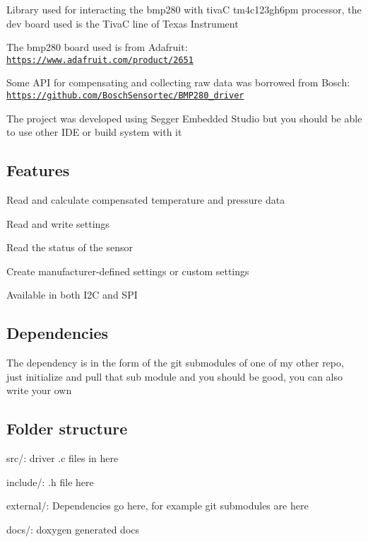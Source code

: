 Library used for interacting the bmp280 with tivaC tm4c123gh6pm processor, the dev board used is the TivaC line of Texas Instrument

The bmp280 board used is from Adafruit\+: \href{https://www.adafruit.com/product/2651}{\tt https\+://www.\+adafruit.\+com/product/2651}

Some A\+PI for compensating and collecting raw data was borrowed from Bosch\+: \href{https://github.com/BoschSensortec/BMP280_driver}{\tt https\+://github.\+com/\+Bosch\+Sensortec/\+B\+M\+P280\+\_\+driver}

The project was developed using Segger Embedded Studio but you should be able to use other I\+DE or build system with it

\subsection*{Features}


\begin{DoxyItemize}
\item Read and calculate compensated temperature and pressure data
\item Read and write settings
\item Read the status of the sensor
\item Create manufacturer-\/defined settings or custom settings
\item Available in both I2C and S\+PI
\end{DoxyItemize}

\subsection*{Dependencies}

The dependency is in the form of the git submodules of one of my other repo, just initialize and pull that sub module and you should be good, you can also write your own

\subsection*{Folder structure}


\begin{DoxyItemize}
\item src/\+: driver .c files in here
\item include/\+: .h file here
\item external/\+: Dependencies go here, for example git submodules are here
\item docs/\+: doxygen generated docs
\end{DoxyItemize}

